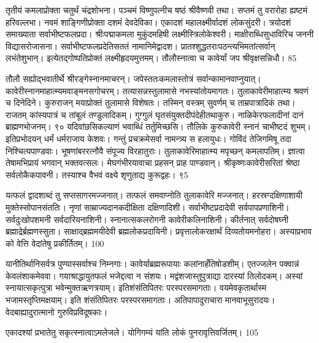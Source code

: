   तृतीयं कमलाप्रोक्ता चतुर्थं चंद्रशोभना।
 पञ्चमं विष्णुपत्नीच षष्ठं श्रीवैष्णवी तथा।
 सप्तमं तु वरारोहा ह्यष्टमं हरिवल्लभा।
 नवमं शाङ्गिणीप्रोक्ता दशमं देवदेविका।
 एकादशं महालक्ष्मीर्वादशं लोकसुंदरी।
 त्रयोदशं समाख्याता सर्वाभीष्टफलप्रदा।
 श्रीःपद्माकमला मुकुंदमहिषी लक्ष्मीस्त्रिलोकेश्वरी।
 माक्षीराब्धिसुधाविरिच जननी विद्यासरोजासना।
 सर्वाभीष्टफलप्रदेतिसततं नामानिमेद्वादश।
 प्रातश्शुद्धतराःपठन्त्यभिमतांत्सर्वान् लभंतेशुभान्।
 इत्येतद्गोष्पतिप्रोक्तं लक्ष्मीहृदयमुत्तमम्।
 तौलौस्नात्वा च कावेर्यां जप श्रीवृक्षसन्निधौ।
 85

 
तौलौ सह्योद्भवातीर्थे श्रीरङ्गेस्नानमाचरन्।
 जपेस्ततःकमलास्तोत्रं सर्वान्कामानवाप्नुयात्।
 कावेरीस्नानमाहात्म्यमवाङ्मनसगोचरम्।
 तत्यासन्नस्तुलामासे नभस्यांतोयमागतः।
 तुलाकावेरीमाहात्म्य श्रवणं च दिनेदिने।
 कुरुराजन् मयाप्रोक्तं तुलामासे विशेषतः।
 तस्मिन् वस्त्रम् सुवर्णम् च ताम्रपात्रादिकं तथा।
 राजतम् कांस्यपात्रं च तांबूलं तण्डुलादिकम्।
 गुग्गुलं घृतसंयुक्तदीपंदेहीतथाकुरु।
 नाळिकेरफलादीनां दानं ब्राह्मणभोजनम्।
 ९० यदिवांछसिकल्याणं भवाब्धिं तर्तुमिच्छसि।
 तौलिके कुरुकावेरी स्नानं चाभीष्टदं शुभम्।
 इतिप्रभोदयन् धर्मं धर्मराजाय केशवः।
 गन्तुं प्रचक्रमेसर्वा नामन्त्र्य स हलायुधः।
 गोविंदं तेजिगमिषू तदा निश्चित्यपाण्डवाः।
 भूषणांबररत्नौवै संपूज्य विरहातुराः।
 तुलाकावेरिमाहात्म्य मपृच्छन् कमलापतिम्।
 ज्ञात्वा तेषामभिप्रायं भगवान् भक्तवत्सलः।
 मेघगंभीरयावाचा प्रहसन् प्राह पाण्डवान्।
 श्रीकृष्णःकावेरीसरितां श्रेष्ठा सर्वलोकैकपावनी।
 तस्याश्च वैभवं वक्ष्ये शृणुताद्य कुरूद्वहः।
 ९5

 
यत्फलं द्वादशाब्दं तु सप्तसागरमज्जनात्।
 तत्फलं समवाप्नोति तुलाकावेरि मज्जनात्।
 हरस्रग्दक्षिणाशायी मुक्तेस्सोपानसंततिः।
 नृणां साम्राज्यदानकदीक्षिता दक्षिणादिशी।
 सर्वाभीष्टप्रदादेवी सर्वपापप्रणाशिनी।
 सर्वदुःखोपशमनी सर्वदारियनाशिनी।
 स्नानात्सकलरोगनी कावेरीकलिनाशिनी।
 कीर्तनात् सर्वदोषघ्नी ब्रह्माद्रेर्ब्रह्मणस्सुता।
 साक्षाद्ब्रह्ममयीदेवी ब्रह्मलोकप्रदायिनी।
 प्रवृत्तालोकरक्षार्थं दिव्यतोयमनोहरा।
 अस्याप्रभाव को वेत्ति वेदांतेषु प्रकीर्तितम्।
 100

  यानीतिर्थानिसर्वत्र पुण्यास्सर्वाश्च निम्नगाः।
 कावेर्याब्रह्मरूपायाः कलांनाहँतिषोडशीम्।
 एतज्जलेन पक्वान्नं केवलंशाकमेववा।
 गयाश्राद्धायुतफलं भजेद्दत्वा न संशयः।
 मद्वंशजास्तुपुत्राद्या दारस्यां तिलोदकम्।
 अस्यां स्नायात्सकृत्पुत्रा भवेन्मुक्तऋणत्रयाम्।
 इतिशंसंतिपितरः परस्परसमागताः।
 वयमेवकृतार्थास्म भजामस्तृप्तिमक्षयाम्।
 इति शंसंतिपितरः परस्परसमागताः।
 अतिपापादुराचारा मानवाभूसुरादयः।
 वेदबाह्यादुरात्मानो गुरुविप्रविदूषकाः।
 
एकादश्यां प्रभातेतु सकृत्स्नात्वाऽमलेजले।
 योगिगम्यं यांति लोकं पुनरावृत्तिवर्जितम्।
 105

